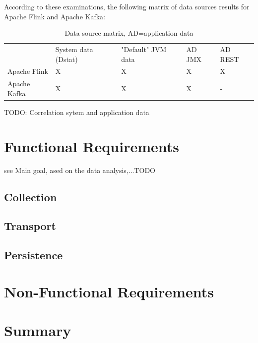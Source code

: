 According to these examinations, the following matrix of data sources results for Apache Flink and Apache Kafka:

\begin{table}[H]
\begin{tabular}{lllll}
 & System data (Dstat) & "Default" JVM data & AD JMX & AD REST \\
Apache Flink & X & X & X & X \\
Apache Kafka & X & X & X & - \\
\end{tabular}
\caption{Data source matrix, AD=application data}
\label{data-source-matrix}
\end{table}

TODO: Correlation sytem and application data
%
%

\section{Functional Requirements}
see Main goal, ased on the data analysis,...TODO
%
%
%
%
%
\subsection{Collection}

\subsection{Transport}

\subsection{Persistence}

\section{Non-Functional Requirements}

\section{Summary}